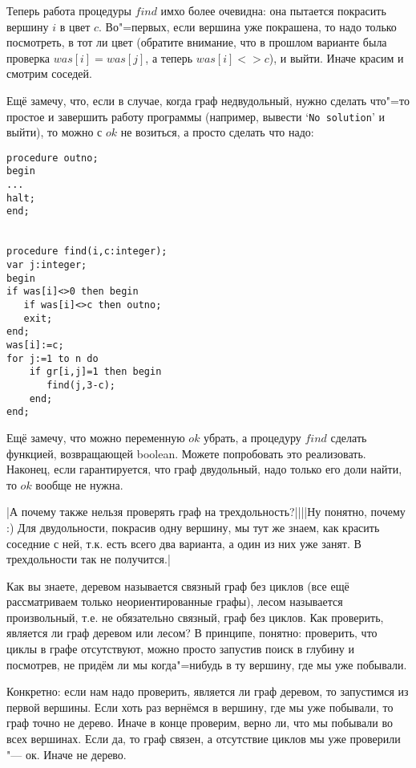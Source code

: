 Теперь работа процедуры $find$ имхо более очевидна: она пытается покрасить вершину $i$ в цвет $c$. 
Во"=первых, если вершина уже покрашена, то надо только посмотреть, в тот ли цвет (обратите 
внимание, что в прошлом варианте была проверка $was[i]=was[j]$, а теперь $was[i]<>c$), и выйти. 
Иначе красим и смотрим соседей.

Ещё замечу, что, если в случае, когда граф недвудольный, нужно сделать что"=то простое и завершить 
работу программы (например, вывести `\texttt{No solution}' и выйти), то можно с $ok$ не возиться, а 
просто сделать что надо:
\begin{codesample}
\begin{verbatim}
procedure outno;
begin
...
halt;
end;


procedure find(i,c:integer);
var j:integer;
begin
if was[i]<>0 then begin
   if was[i]<>c then outno;
   exit;
end;
was[i]:=c;
for j:=1 to n do
    if gr[i,j]=1 then begin
       find(j,3-c);
    end;
end;
\end{verbatim}
\end{codesample}

Ещё замечу, что можно переменную $ok$ убрать, а процедуру $find$ сделать функцией, возвращающей boolean. Можете 
попробовать это реализовать. Наконец, если гарантируется, что граф двудольный, надо только его доли 
найти, то $ok$ вообще не нужна.

\task|А почему также нельзя проверять граф на трехдольность?||||Ну понятно, почему :) Для двудольности, 
покрасив одну вершину, мы тут же знаем, как красить
соседние с ней, т.к. есть всего два варианта, а один из них уже занят. В трехдольности так не получится.|\label{tripartie}

Как вы знаете, деревом называется связный граф без циклов (все ещё рассматриваем только 
неориентированные графы), лесом называется произвольный, т.е. не обязательно связный, граф без 
циклов. Как проверить, является ли граф деревом или лесом? В принципе, понятно: проверить, что 
циклы в графе отсутствуют, можно просто запустив поиск в глубину и посмотрев, не придём ли мы 
когда"=нибудь в ту вершину, где мы уже побывали.

Конкретно: если нам надо проверить, является ли граф деревом, то запустимся из первой вершины. Если 
хоть раз вернёмся в вершину, где мы уже побывали, то граф точно не дерево. Иначе в конце проверим, 
верно ли, что мы побывали во всех вершинах. Если да, то граф связен, а отсутствие циклов мы уже 
проверили "--- ок. Иначе не дерево.


